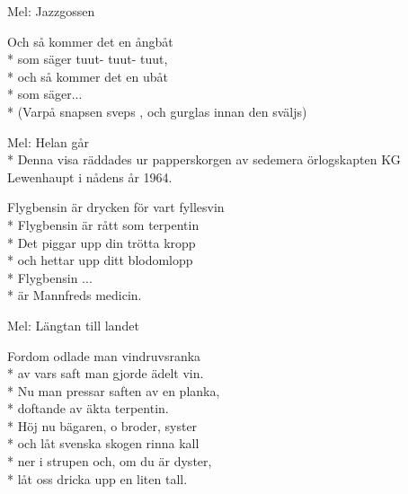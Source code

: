 \begin{SongText}[Ångbåten]
    \begin{SongInfo}
        Mel: Jazzgossen
    \end{SongInfo}
    \begin{SongVerse}
        Och så kommer det en ångbåt\\*%
        som säger tuut- tuut- tuut,\\*%
        och så kommer det en ubåt\\*%
        som säger...\\*%
        (Varpå snapsen sveps , och gurglas innan den sväljs)
    \end{SongVerse}
\end{SongText}
\begin{SongText}
    \begin{SongInfo}
        Mel: Helan går\\*%
        Denna visa räddades ur papperskorgen av sedemera örlogskapten KG Lewenhaupt i nådens år 1964.
    \end{SongInfo}
    \begin{SongVerse}
        Flygbensin är drycken för vart fyllesvin\\*%
        Flygbensin är rått som terpentin\\*%
        Det piggar upp din trötta kropp\\*%
        och hettar upp ditt blodomlopp\\*%
        Flygbensin ...\\*%
        är Mannfreds medicin.
    \end{SongVerse}
\end{SongText}
\begin{SongText}[Tallen]
    \begin{SongInfo}
        Mel: Längtan till landet
    \end{SongInfo}
    \begin{SongVerse}
        Fordom odlade man vindruvsranka\\*%
        av vars saft man gjorde ädelt vin.\\*%
        Nu man pressar saften av en planka,\\*%
        doftande av äkta terpentin.\\*%
        Höj nu bägaren, o broder, syster\\*%
        och låt svenska skogen rinna kall\\*%
        ner i strupen och, om du är dyster,\\*%
        låt oss dricka upp en liten tall.
    \end{SongVerse}
\end{SongText}
